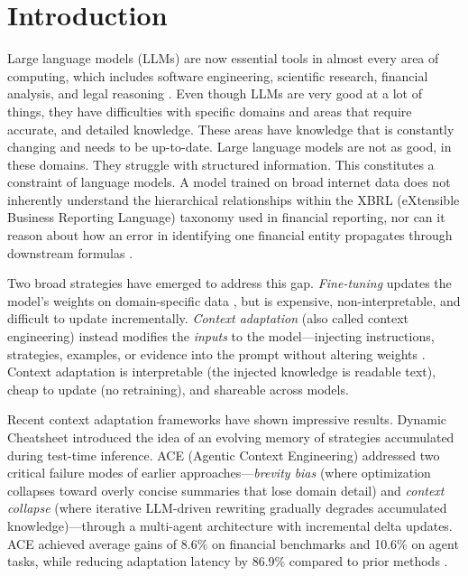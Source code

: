 \documentclass[12pt,a4paper,oneside]{article}
\begin{document}
\newpage
\thispagestyle{plain}
\tableofcontents
\newpage

\section{Introduction}
\label{sec:introduction}

Large language models (LLMs) are now essential tools in almost every area of computing, which includes software engineering, scientific research, financial analysis, and legal reasoning \citep{brown2020language, openai2023gpt4}. Even though LLMs are very good at a lot of things, they have difficulties with specific domains and areas that require accurate, and detailed knowledge. These areas have knowledge that is constantly changing and needs to be up-to-date. Large language models are not as good, in these domains. They struggle with structured information. This constitutes a constraint of language models. A model trained on broad internet data does not inherently understand the hierarchical relationships within the XBRL (eXtensible Business Reporting Language) taxonomy used in financial reporting, nor can it reason about how an error in identifying one financial entity propagates through downstream formulas \citep{loukas2022finer}.

Two broad strategies have emerged to address this gap. \textit{Fine-tuning} updates the model's weights on domain-specific data \citep{wang2025finlora}, but is expensive, non-interpretable, and difficult to update incrementally. \textit{Context adaptation} (also called context engineering) instead modifies the \textit{inputs} to the model---injecting instructions, strategies, examples, or evidence into the prompt without altering weights \citep{ace2025}. Context adaptation is interpretable (the injected knowledge is readable text), cheap to update (no retraining), and shareable across models.

Recent context adaptation frameworks have shown impressive results. Dynamic Cheatsheet \citep{suzgun2025dynamic} introduced the idea of an evolving memory of strategies accumulated during test-time inference. ACE (Agentic Context Engineering) \citep{ace2025} addressed two critical failure modes of earlier approaches---\textit{brevity bias} (where optimization collapses toward overly concise summaries that lose domain detail) and \textit{context collapse} (where iterative LLM-driven rewriting gradually degrades accumulated knowledge)---through a multi-agent architecture with incremental delta updates. ACE achieved average gains of 8.6\% on financial benchmarks and 10.6\% on agent tasks, while reducing adaptation latency by 86.9\% compared to prior methods \citep{ace2025}.
\end{document}
